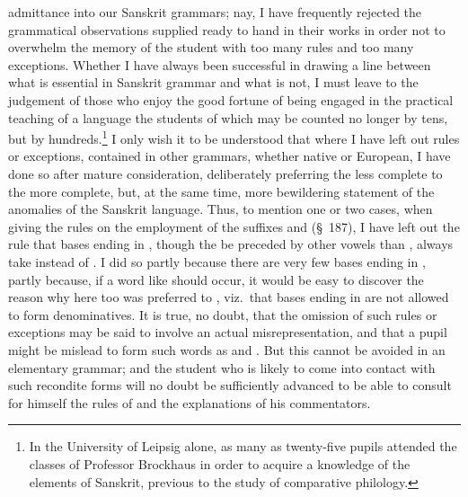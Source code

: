 admittance into our Sanskrit grammars; nay, I have frequently rejected
the grammatical observations supplied ready to hand in their works in
order not to overwhelm the memory of the student with too many rules and
too many exceptions. Whether I have always been successful in drawing a
line between what is essential in Sanskrit grammar and what is not, I
must leave to the judgement of those who enjoy the good fortune of being
engaged in the practical teaching of a language the students of which
may be counted no longer by tens, but by hundreds.\footnote{In the
  University of Leipsig alone, as many as twenty-five pupils attended
  the classes of Professor Brockhaus in order to acquire a knowledge of
  the elements of Sanskrit, previous to the study of comparative
  philology.} I only wish it to be understood that where I have left out
rules or exceptions, contained in other grammars, whether native or
European, I have done so after mature consideration, deliberately
preferring the less complete to the more complete, but, at the same
time, more bewildering statement of the anomalies of the Sanskrit
language. Thus, to mention one or two cases, when giving the rules on
the employment of the suffixes  and  (\S~187), I have
left out the rule that bases ending in , though the  be
preceded by other vowels than , always take  instead of
. I did so partly because there are very few bases ending in
, partly because, if a word like  should occur, it
would be easy to discover the reason why here too  was preferred
to , viz.\ that bases ending in  are not allowed to form
denominatives. It is true, no doubt, that the omission of such rules or
exceptions may be said to involve an actual misrepresentation, and that
a pupil might be mislead to form such words as  and
. But this cannot be avoided in an elementary grammar; and
the student who is likely to come into contact with such recondite forms
will no doubt be sufficiently advanced to be able to consult for himself
the rules of \panini{} and the explanations of his commentators.

